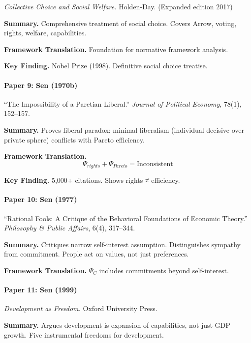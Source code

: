 \textit{Collective Choice and Social Welfare.}
Holden-Day. (Expanded edition 2017)

\textbf{Summary.}
Comprehensive treatment of social choice. Covers Arrow, voting, 
rights, welfare, capabilities.

\textbf{Framework Translation.}
Foundation for normative framework analysis.

\textbf{Key Finding.}
Nobel Prize (1998). Definitive social choice treatise.

\paragraph{Paper 9: Sen (1970b)}

``The Impossibility of a Paretian Liberal.''
\textit{Journal of Political Economy}, 78(1), 152--157.

\textbf{Summary.}
Proves liberal paradox: minimal liberalism (individual decisive over 
private sphere) conflicts with Pareto efficiency.

\textbf{Framework Translation.}
\begin{equation}
\Psi_{rights} + \Psi_{Pareto} = \text{Inconsistent}
\end{equation}

\textbf{Key Finding.}
5,000+ citations. Shows rights ≠ efficiency.

\paragraph{Paper 10: Sen (1977)}

``Rational Fools: A Critique of the Behavioral Foundations of Economic Theory.''
\textit{Philosophy \& Public Affairs}, 6(4), 317--344.

\textbf{Summary.}
Critiques narrow self-interest assumption. Distinguishes sympathy from 
commitment. People act on values, not just preferences.

\textbf{Framework Translation.}
$\Psi_C$ includes commitments beyond self-interest.

\paragraph{Paper 11: Sen (1999)}

\textit{Development as Freedom.}
Oxford University Press.

\textbf{Summary.}
Argues development is expansion of capabilities, not just GDP growth.
Five instrumental freedoms for development.

